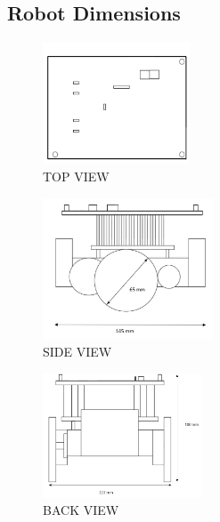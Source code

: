 \subsection*{Robot Dimensions}
\vspace{-3mm}
\begin{figure}[H]
\centering
\includegraphics[width=0.39\textwidth]{figures/top_view.jpg}
\caption{TOP VIEW}
\end{figure}

\begin{figure}[H]
\centering
\hspace{-5mm}
\includegraphics[width=0.45\textwidth]{figures/side_view.JPG}
\caption{SIDE VIEW}
\end{figure}

\begin{figure}[H]
\centering
\includegraphics[width=0.42\textwidth]{figures/back_view.JPG}
\caption{BACK VIEW}
\end{figure}